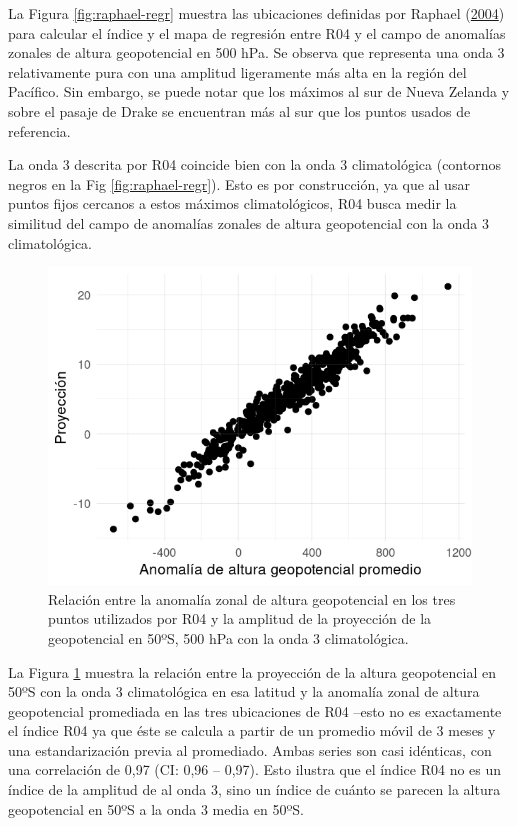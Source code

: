 \documentclass[12pt,oneside,a4paper]{reedthesis}
\begin{document}
La Figura \ref{fig:raphael-regr} muestra las ubicaciones definidas por Raphael (\protect\hyperlink{ref-raphael2004}{2004}) para calcular el índice y el mapa de regresión entre R04 y el campo de anomalías zonales de altura geopotencial en 500 hPa.
Se observa que representa una onda 3 relativamente pura con una amplitud ligeramente más alta en la región del Pacífico.
Sin embargo, se puede notar que los máximos al sur de Nueva Zelanda y sobre el pasaje de Drake se encuentran más al sur que los puntos usados de referencia.

La onda 3 descrita por R04 coincide bien con la onda 3 climatológica (contornos negros en la Fig \ref{fig:raphael-regr}).
Esto es por construcción, ya que al usar puntos fijos cercanos a estos máximos climatológicos, R04 busca medir la similitud del campo de anomalías zonales de altura geopotencial con la onda 3 climatológica.

\begin{figure}

{\centering \includegraphics{figures/15-onda3/pseudo-raphael-1} 

}

\caption{Relación entre la anomalía zonal de altura geopotencial en los tres puntos utilizados por R04 y la amplitud de la proyección de la geopotencial en 50ºS, 500 hPa con la onda 3 climatológica.}\label{fig:pseudo-raphael}
\end{figure}



La Figura \ref{fig:pseudo-raphael} muestra la relación entre la proyección de la altura geopotencial en 50ºS con la onda 3 climatológica en esa latitud y la anomalía zonal de altura geopotencial promediada en las tres ubicaciones de R04 --esto no es exactamente el índice R04 ya que éste se calcula a partir de un promedio móvil de 3 meses y una estandarización previa al promediado.
Ambas series son casi idénticas, con una correlación de 0,97 (CI: 0,96 -- 0,97).
Esto ilustra que el índice R04 no es un índice de la amplitud de al onda 3, sino un índice de cuánto se parecen la altura geopotencial en 50ºS a la onda 3 media en 50ºS.
\end{document}
